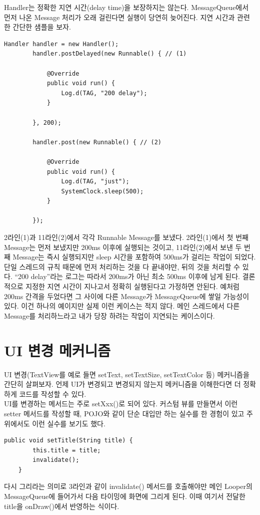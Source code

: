 Handler는 정확한 지연 시간(delay time)을 보장하지는 않는다. 
MessageQueue에서 먼저 나온 Message 처리가 오래 걸린다면 실행이 당연히 늦어진다. 지연 시간과 관련한 간단한 샘플을 보자.
\begin{lstlisting}[frame=single, caption=부정확한 지연시간] 
		Handler handler = new Handler();
		handler.postDelayed(new Runnable() { // (1)

			@Override
			public void run() {
				Log.d(TAG, "200 delay");
			}
			
		}, 200);
		
		handler.post(new Runnable() { // (2)

			@Override
			public void run() {
				Log.d(TAG, "just");
				SystemClock.sleep(500);
			}
			
		});
\end{lstlisting}
2라인(1)과 11라인(2)에서 각각 Runnable Message를 보냈다. 
2라인(1)에서 첫 번째 Message는 먼저 보냈지만 200ms 이후에 실행되는 것이고, 11라인(2)에서 보낸 두 번째 Message는 즉시 실행되지만 sleep 시간을 포함하여 500ms가 걸리는 작업이 되었다. 
단일 스레드의 규칙 때문에 먼저 처리하는 것을 다 끝내야만, 뒤의 것을 처리할 수 있다. ``200 delay''라는 로그는 따라서 200ms가 아닌 최소 500ms 이후에 남게 된다.
결론적으로 지정한 지연 시간이 지나고서 정확히 실행된다고 가정하면 안된다. 
예처럼 200ms 간격을 두었다면 그 사이에 다른 Message가 MessageQueue에 쌓일 가능성이 있다.
이건 하나의 예이지만 실제 이런 케이스는 적지 않다. 메인 스레드에서 다른 Message를 처리하느라고 내가 당장 하려는 작업이 지연되는 케이스이다.

\section{UI 변경 메커니즘}
UI 변경(TextView를 예로 들면 setText, setTextSize, setTextColor 등) 메커니즘을 간단히 살펴보자.
언제 UI가 변경되고 변경되지 않는지  메커니즘을 이해한다면 더 정확하게 코드를 작성할 수 있다.\\

UI를 변경하는 메서드는 주로 setXxx()로 되어 있다. 
커스텀 뷰를 만들면서 이런 setter 메서드를 작성할 때, POJO와 같이 단순 대입만 하는 실수를 한 경험이 있고 주위에서도 이런 실수를 보기도 했다. 
\begin{lstlisting}[frame=single]
	public void setTitle(String title) {
		this.title = title;
		invalidate();
	}
\end{lstlisting}
다시 그리라는 의미로 3라인과 같이 invalidate() 메서드를 호출해야만 메인 Looper의 MessageQueue에 들어가서 다음 타이밍에 화면에 그리게 된다. 
이때 여기서 전달한 title을 onDraw()에서 반영하는 식이다.\\

